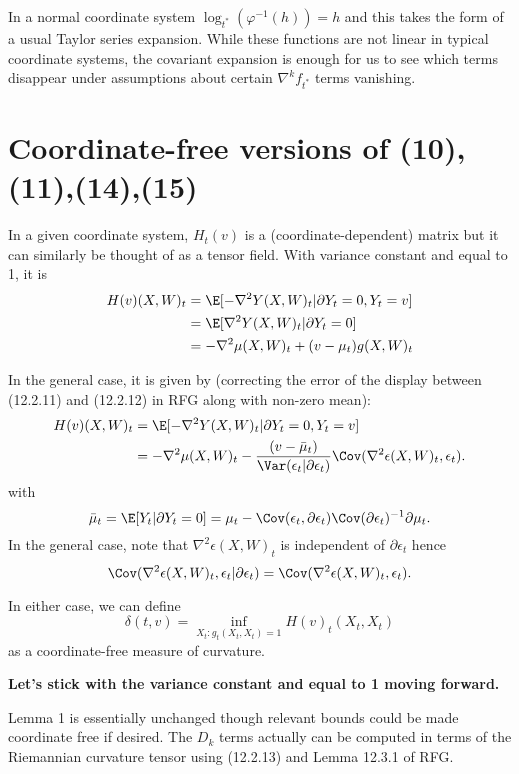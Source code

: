 \documentclass{article}
\begin{document}
In a normal coordinate system $\log_{t^*}(\varphi^{-1}(h))=h$ and this takes the form of a usual Taylor series expansion. While these functions are not linear in typical coordinate systems, the covariant expansion is enough for
us to see which terms disappear under assumptions about certain $\nabla^k f_{t^*}$ terms vanishing.

\section{Coordinate-free versions of (10),(11),(14),(15)}

In a given coordinate system, $H_t(v)$ is a (coordinate-dependent) matrix but it can similarly
be thought of as a tensor field. With variance constant and equal to 1, it is
$$
\begin{aligned}
  H(v)(X, W)_t &= \E[-\nabla^2 Y(X, W)_t | \partial Y_t=0, Y_t=v] \\
  &= \E[\nabla^2 Y(X, W)_t | \partial Y_t=0] \\
  &=- \nabla^2 \mu(X, W)_t + (v-\mu_t)g(X, W)_t
\end{aligned}
$$

In the general case, it is given by (correcting the error of the display between (12.2.11) and (12.2.12) in RFG along with non-zero mean):
$$
\begin{aligned}
  H(v)(X, W)_t &= \E[-\nabla^2 Y(X, W)_t | \partial Y_t=0, Y_t=v] \\
  &= -\nabla^2 \mu(X, W)_t - \frac{(v-\bar{\mu}_t)}{\text{\Var}(\epsilon_t|\partial \epsilon_t)} \Cov(\nabla^2 \epsilon(X, W)_t, \epsilon_t).
\end{aligned}
$$
with
$$
\bar{\mu}_t = \E[Y_t|\partial Y_t=0] = \mu_t - \Cov(\epsilon_t,\partial \epsilon_t) \Cov(\partial \epsilon_t)^{-1} \partial \mu_t.
$$
In the general case, note that $\nabla^2 \epsilon(X, W)_t$ is independent of $\partial \epsilon_t$ hence
$$
\Cov(\nabla^2 \epsilon(X, W)_t, \epsilon_t | \partial \epsilon_t) = \Cov(\nabla^2 \epsilon(X, W)_t, \epsilon_t).
$$

In either case, we can define
$$
\delta(t,v) = \inf_{X_t: g_t(X_t,X_t)=1} H(v)_t(X_t,X_t)
$$
as a coordinate-free measure of curvature.

{\bf Let's stick with the variance constant and equal to 1 moving forward.}

Lemma 1 is essentially unchanged though relevant bounds could be made coordinate free if desired.
The $D_k$ terms actually can be computed in terms of the Riemannian curvature tensor using
(12.2.13) and Lemma 12.3.1 of RFG.
\end{document}
